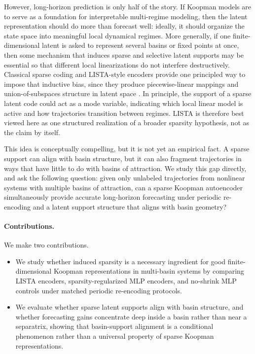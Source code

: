 However, long-horizon prediction is only half of the story. If Koopman models are to serve as a foundation for interpretable multi-regime modeling, then the latent representation should do more than forecast well: ideally, it should organize the state space into meaningful local dynamical regimes. More generally, if one finite-dimensional latent is asked to represent several basins or fixed points at once, then some mechanism that induces sparse and selective latent supports may be essential so that different local linearizations do not interfere destructively. Classical sparse coding and LISTA-style encoders provide one principled way to impose that inductive bias, since they produce piecewise-linear mappings and union-of-subspaces structure in latent space \citep{olshausen_emergence_1996, chen_atomic_1998, donoho_optimally_2003, gregor_learning_2010}. In principle, the support of a sparse latent code could act as a mode variable, indicating which local linear model is active and how trajectories transition between regimes. LISTA is therefore best viewed here as one structured realization of a broader sparsity hypothesis, not as the claim by itself.

This idea is conceptually compelling, but it is not yet an empirical fact. A sparse support can align with basin structure, but it can also fragment trajectories in ways that have little to do with basins of attraction.
We study this gap directly, and ask the following question: given only unlabeled trajectories from nonlinear systems with multiple basins of attraction, can a sparse Koopman autoencoder simultaneously provide accurate long-horizon forecasting under periodic re-encoding and a latent support structure that aligns with basin geometry? 


\paragraph{Contributions.}
We make two contributions.
\begin{itemize}
    \item We study whether induced sparsity is a necessary ingredient for good finite-dimensional Koopman representations in multi-basin systems by comparing LISTA encoders, sparsity-regularized MLP encoders, and no-shrink MLP controls under matched periodic re-encoding protocols.
    \item We evaluate whether sparse latent supports align with basin structure, and whether forecasting gains concentrate deep inside a basin rather than near a separatrix, showing that basin-support alignment is a conditional phenomenon rather than a universal property of sparse Koopman representations.
\end{itemize}

